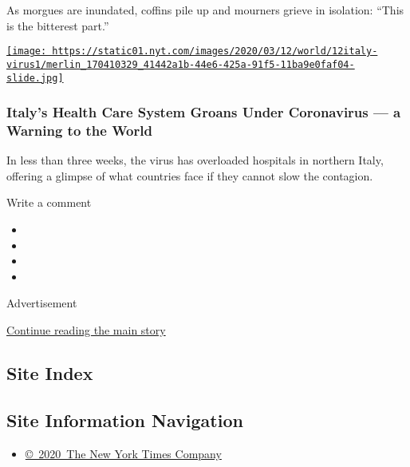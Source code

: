 As morgues are inundated, coffins pile up and mourners grieve in
isolation: ``This is the bitterest part.''

\href{https://www.nytimes.com/2020/03/12/world/europe/12italy-coronavirus-health-care.html}{\texttt{[image: https://static01.nyt.com/images/2020/03/12/world/12italy-virus1/merlin\_170410329\_41442a1b-44e6-425a-91f5-11ba9e0faf04-slide.jpg]}}

\hypertarget{italys-health-care-system-groans-under-coronavirus--a-warning-to-the-world}{%
\subsubsection{Italy's Health Care System Groans Under Coronavirus --- a
Warning to the
World}\label{italys-health-care-system-groans-under-coronavirus--a-warning-to-the-world}}

In less than three weeks, the virus has overloaded hospitals in northern
Italy, offering a glimpse of what countries face if they cannot slow the
contagion.

Write a comment

\begin{itemize}
\item
\item
\item
\item
\end{itemize}

Advertisement

\protect\hyperlink{after-bottom}{Continue reading the main story}

\hypertarget{site-index}{%
\subsection{Site Index}\label{site-index}}

\hypertarget{site-information-navigation}{%
\subsection{Site Information
Navigation}\label{site-information-navigation}}

\begin{itemize}
\tightlist
\item
  \href{https://help.nytimes.com/hc/en-us/articles/115014792127-Copyright-notice}{©~2020~The
  New York Times Company}
\end{itemize}


